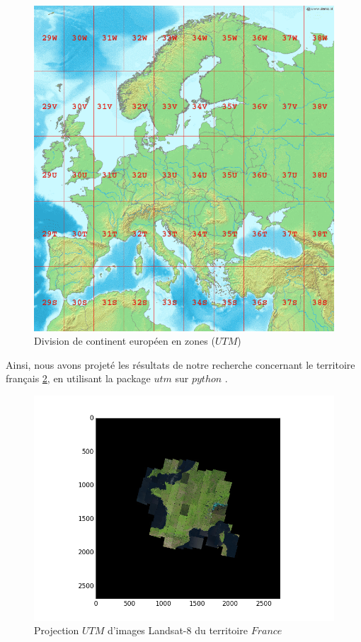\documentclass{book}
\begin{document}
\begin{figure}[H]
\begin{center}
\includegraphics[scale=0.3]{images/utm_zones_europe.png}
\end{center}
\caption{Division de continent européen en zones ($UTM$) \cite{wiki:utm}}
\label{utm_france}
\end{figure}

\clearpage

Ainsi, nous avons projeté les résultats de notre recherche concernant le territoire français \ref{projection_france}, en utilisant 
la package $utm$ sur $python$ \cite{utm_package}.

\begin{figure}[H]
\begin{center}
\includegraphics[scale=0.8]{images/projection_france.png}
\end{center}
\caption{Projection $UTM$ d'images Landsat-8 du territoire $France$}
\label{projection_france}
\end{figure}
\end{document}
